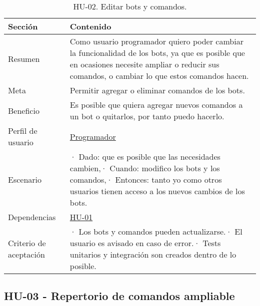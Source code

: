 \begin{table}[H]
    \centering
    \def\arraystretch{1.25}
    \begin{adjustbox}{max width=\textwidth}
    \begin{tabularx}{\textwidth}{|l|L|}
    \hline
        \textbf{Sección} & \textbf{Contenido} \\ \hline
    \hline
        Resumen & Como usuario programador quiero poder cambiar la funcionalidad de los bots, ya que es posible que en ocasiones necesite ampliar o reducir sus comandos, o cambiar lo que estos comandos hacen. \\ \hline
        Meta & Permitir agregar o eliminar comandos de los bots. \\ \hline
        Beneficio & Es posible que quiera agregar nuevos comandos a un bot o quitarlos, por tanto puedo hacerlo.  \\ \hline
        Perfil de usuario & \hyperref[sec:personaProgramador]{Programador} \\ \hline
        Escenario & · Dado: que es posible que las necesidades cambien,\linebreak · Cuando: modifico los bots y los comandos,\linebreak · Entonces: tanto yo como otros usuarios tienen acceso a los nuevos cambios de los bots. \\ \hline
        Dependencias & \hyperref[sec:hu01]{HU-01} \\ \hline
        Criterio de aceptación & · Los bots y comandos pueden actualizarse.\linebreak · El usuario es avisado en caso de error.\linebreak · Tests unitarios y integración son creados dentro de lo posible. \\ \hline
    \end{tabularx}
    \end{adjustbox}
    \caption{HU-02. Editar bots y comandos.}
\end{table}


\subsection{HU-03 - Repertorio de comandos ampliable}
\label{sec:hu03}

